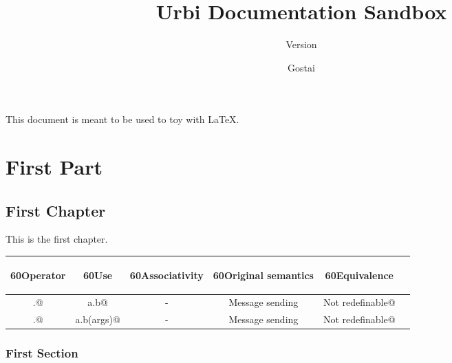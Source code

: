 \documentclass[openright,twoside,11pt]{book}
\title{Urbi Documentation Sandbox}
\subtitle{Version \VcsDescription}
\author{Gostai}
\begin{document}
\maketitle

This document is meant to be used to toy with \LaTeX{}.

\tableofcontents
\part{First Part}
\chapter{First Chapter}

This is the first chapter.

\newcommand{\tilt}[1]{\multicolumn{1}{c}{\begin{turn}{60}\textbf{#1}\end{turn}}}
\newcommand{\operatorhead}{
  \tilt{Operator}
  & \tilt{Use}
  & \tilt{Associativity}
  & \tilt{Original semantics}
  & \tilt{Equivalence}
}


\newcommand{\operator}[6][ ]{\lstinline@#2@&\lstinline@#3@&#4&#5&\lstinline@#6@#1\\}

\newcommand{\operatordot}    {\operator  {.}    {a.b}              {-}     {Message sending}          {Not redefinable}       }
\newcommand{\operatordota}   {\operator  {.}    {a.b(args)}        {-}     {Message sending}          {Not redefinable}       }


\begin{tabular}{|c|c|c|c|c|c|}
  \hline
  \operatorhead
  \\
  \hline
  \operatordot
  \operatordota
  \hline
\end{tabular}

\section{First Section}
\newcommand{\optionHelp}
  {Display the help message and exit successfully.}

\newcommand{\optionVersion}
  {Display version information and exit successfully.}
\end{document}
